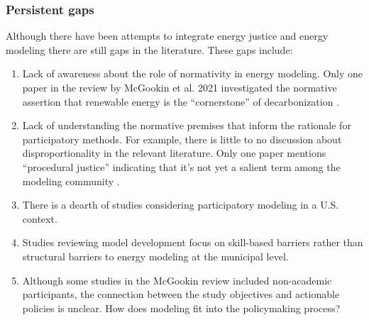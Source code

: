 
\subsubsection{Persistent gaps}
Although there have been attempts to integrate energy justice and energy modeling
there are still gaps in the literature. These gaps include:
\begin{enumerate}
    \item Lack of awareness about the role of normativity in energy modeling.
    Only one paper in the review by McGookin et al. 2021 investigated the
    normative assertion that renewable energy is the ``cornerstone'' of
    decarbonization \cite{zelt_long-term_2019}.
    \item Lack of understanding the normative premises that inform the rationale
    for participatory methods. For example, there is little to no discussion
    about disproportionality in the relevant literature. Only one paper mentions
    ``procedural justice'' indicating that it's not yet a salient term among the
    modeling community \cite{knudsen_local_2015}.
    \item There is a dearth of studies considering participatory modeling in a
    U.S. context.
    \item Studies reviewing model development focus on skill-based barriers
    rather than structural barriers to energy modeling at the municipal level.
    \item Although some studies in the McGookin review
    \cite{mcgookin_participatory_2021} included non-academic participants, the
    connection between the study objectives and actionable policies is unclear.
    How does modeling fit into the policymaking process?
\end{enumerate}

